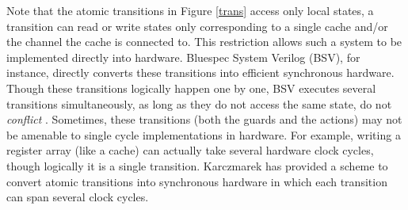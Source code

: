 Note that the atomic transitions in Figure \ref{trans} access only local states,
\ie a transition can read or write states only corresponding to a single cache
and/or the channel the cache is connected to. This restriction allows such a
system to be implemented directly into hardware. Bluespec System Verilog (BSV),
for instance, directly converts these transitions into efficient synchronous
hardware. Though these transitions logically happen one by one, BSV executes
several transitions simultaneously, as long as they do not access the same
state, \ie do not \emph{conflict} \cite{Hoe:TCAD,HoeArvind:TRSSynthesis1}.
Sometimes, these transitions (both the guards and the actions) may not be
amenable to single cycle implementations in hardware. For example, writing a
register array (like a cache) can actually take several hardware clock cycles,
though logically it is a single transition.  Karczmarek \etal \cite{Karczmarek}
has provided a scheme to convert atomic transitions into synchronous hardware
in which each transition can span several clock cycles.

